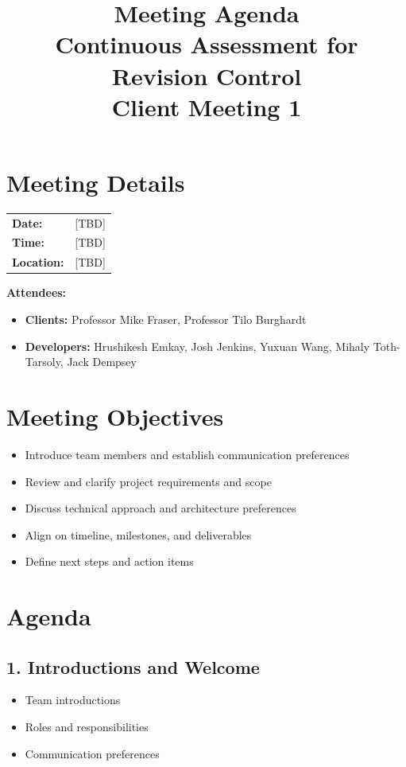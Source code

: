 \documentclass[11pt,a4paper]{article}
\title{\textbf{Meeting Agenda\\Continuous Assessment for Revision Control\\Client Meeting 1}}
\date{}
\begin{document}
\maketitle
\section*{Meeting Details}
\begin{tabular}{ll}
\textbf{Date:} & [TBD] \\
\textbf{Time:} & [TBD] \\
\textbf{Location:} & [TBD] \\
\end{tabular}

\vspace{0.5em}

\textbf{Attendees:}
\begin{itemize}[leftmargin=*]
    \item \textbf{Clients:} Professor Mike Fraser, Professor Tilo Burghardt
    \item \textbf{Developers:} Hrushikesh Emkay, Josh Jenkins, Yuxuan Wang, Mihaly Toth-Tarsoly, Jack Dempsey
\end{itemize}

\vspace{1em}

\section*{Meeting Objectives}
\begin{itemize}[leftmargin=*]
    \item Introduce team members and establish communication preferences
    \item Review and clarify project requirements and scope
    \item Discuss technical approach and architecture preferences
    \item Align on timeline, milestones, and deliverables
    \item Define next steps and action items
\end{itemize}

\vspace{1em}
\section*{Agenda}

\vspace{1em}

\subsection*{1. Introductions and Welcome \hfill}
\begin{itemize}[leftmargin=*]
    \item Team introductions
    \item Roles and responsibilities
    \item Communication preferences
\end{itemize}
\end{document}
